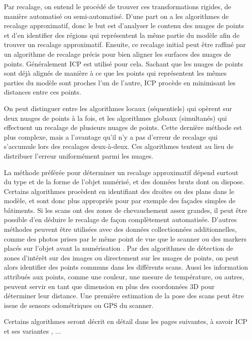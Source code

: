 \documentclass[a4paper,10pt]{scrreprt}
\begin{document}
Par recalage, on entend le procédé de trouver ces transformations rigides, de manière automatisé ou semi-automatisé. D'une part on a les algorithmes de recalage approximatif, donc le but est d'analyser le contenu des nuages de points et d'en identifier des régions qui représentent la même partie du modèle afin de trouver un recalage approximatif. Ensuite, ce recalage initial peut être raffiné par un algorithme de recalage précis pour bien aligner les surfaces des nuages de points. Généralement ICP est utilisé pour cela. Sachant que les nuages de points sont déjà alignés de manière à ce que les points qui représentent les mêmes parties du modèle sont proches l'un de l'autre, ICP procède en minimisant les distances entre ces points.

On peut distinguer entre les algorithmes locaux (séquentiels) qui opèrent sur deux nuages de points à la fois, et les algorithmes globaux (simultanés) qui effectuent un recalage de plusieurs nuages de points. Cette dernière méthode est plus complexe, mais a l'avantage qu'il n'y a pas d'erreur de recalage qui s'accumule lors des recalages deux-à-deux. Ces algorithmes tentent au lieu de distribuer l'erreur uniformément parmi les nuages.

La méthode préférée pour déterminer un recalage approximatif dépend surtout du type et de la forme de l'objet numérisé, et des données bruts dont on dispose. Certains algorithmes procèdent en identifiant des droites \cite{Lich2011} ou des plans \cite{Dold2006} dans le modèle, et sont donc plus appropriés pour par exemple des façades simples de bâtiments. Si les scans ont des zones de chevauchement assez grandes, il peut être possible d'en déduire le recalage de façon complètement automatisée. D'autres méthodes peuvent être utilisées avec des données collectionnées additionnelles, comme des photos prises par le même point de vue que le scanner \cite{Tour2009} ou des markers placés sur l'objet avant la numérisation \cite{Mati2011}. Par des algorithmes de détection de zones d'intérêt \cite{Tuyt2007} sur des images ou directement sur les nuages de points, on peut alors identifier des points communs dans les différents scans. Aussi les information attribués aux points, comme une couleur, une mesure de température, ou autres, peuvent servir en tant que dimension en plus des coordonnées 3D pour déterminer leur distance. Une première estimation de la pose des scans peut être issue de sensors odométriques ou GPS du scanner.

Certains algorithmes seront décrit en détail dans les pages suivantes, à savoir ICP \cite{Besl1992} et ses variantes \cite{Rusi2001}, ...
\end{document}
